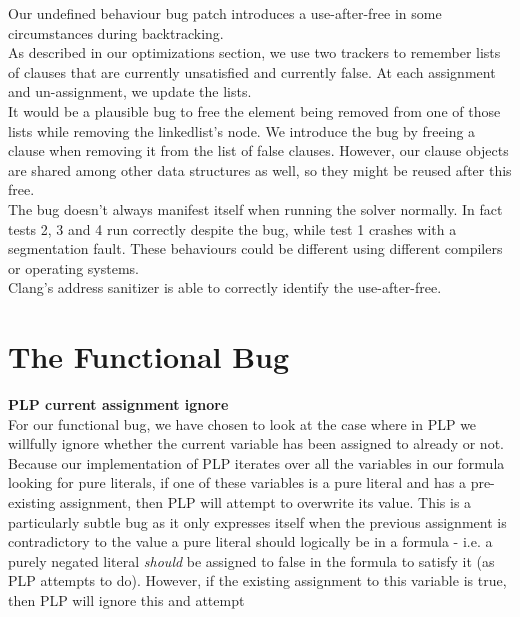 \documentclass[a4paper]{article}
\begin{document}
Our undefined behaviour bug patch introduces a use-after-free in some circumstances during backtracking.\\

As described in our optimizations section, we use two trackers to remember lists of clauses that are currently unsatisfied and currently false. At each assignment and un-assignment, we update the lists.\\

It would be a plausible bug to free the element being removed from one of those lists while removing the linkedlist's node. We introduce the bug by freeing a clause when removing it from the list of false clauses. However, our clause objects are shared among other data structures as well, so they might be reused after this free.\\

The bug doesn't always manifest itself when running the solver normally. In fact tests 2, 3 and 4 run correctly despite the bug, while test 1 crashes with a segmentation fault. These behaviours could be different using different compilers or operating systems.\\

Clang's address sanitizer is able to correctly identify the use-after-free.\\

\section{The Functional Bug}


\textbf{PLP current assignment ignore} \\

For our functional bug, we have chosen to look at the case where in PLP we willfully ignore whether the current variable has been assigned to already or not. Because our implementation of PLP iterates over all the variables in our formula looking for pure literals, if one of these variables is a pure literal and has a pre-existing assignment, then PLP will attempt to overwrite its value. This is a particularly subtle bug as it only expresses itself when the previous assignment is contradictory to the value a pure literal should logically be in a formula - i.e. a purely negated literal \textit{should} be assigned to false in the formula to satisfy it (as PLP attempts to do). However, if the existing assignment to this variable is true, then PLP will ignore this and attempt 
\end{document}
